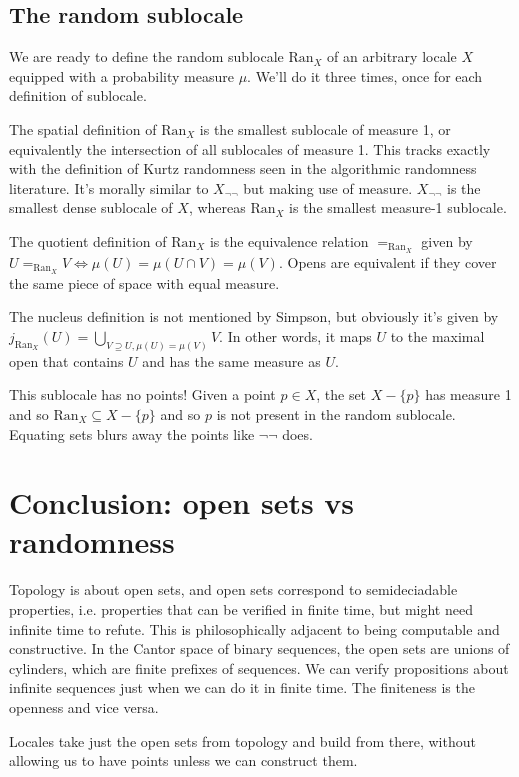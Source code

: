 \documentclass[14pt]{extarticle}
\newcommand{\ran}{\ensuremath{\mathrm{Ran}}}
\begin{document}
\subsection{The random sublocale}
We are ready to define the random sublocale $\ran_X$ of an arbitrary locale $X$ equipped with a probability measure $\mu$. We'll do it three times, once for each definition of sublocale.

The spatial definition of $\ran_X$ is the smallest sublocale of measure 1, or equivalently the intersection of all sublocales of measure 1. This tracks exactly with the definition of Kurtz randomness seen in the algorithmic randomness literature. It's morally similar to $X_{\neg\neg}$ but making use of measure. $X_{\neg\neg}$ is the smallest dense sublocale of $X$, whereas $\ran_X$ is the smallest measure-1 sublocale.

The quotient definition of $\ran_X$ is the equivalence relation $=_{\ran_X}$ given by $U=_{\ran_X} V \iff \mu(U)=\mu(U\cap V)=\mu(V)$. Opens are equivalent if they cover the same piece of space with equal measure.

The nucleus definition is not mentioned by Simpson, but obviously it's given by $j_{\ran_X}(U) = \bigcup_{V\supseteq U, \mu(U)=\mu(V)}V.$ In other words, it maps $U$ to the maximal open that contains $U$ and has the same measure as $U$.

This sublocale has no points! Given a point $p\in X$, the set $X-\{p\}$ has measure 1 and so $\ran_X\subseteq X-\{p\}$ and so $p$ is not present in the random sublocale. Equating sets blurs away the points like $\neg\neg$ does.

\section{Conclusion: open sets vs randomness}
Topology is about open sets, and open sets correspond to semideciadable properties, i.e. properties that can be verified in finite time, but might need infinite time to refute. This is philosophically adjacent to being computable and constructive. In the Cantor space of binary sequences, the open sets are unions of cylinders, which are finite prefixes of sequences. We can verify propositions about infinite sequences just when we can do it in finite time. The finiteness is the openness and vice versa.

Locales take just the open sets from topology and build from there, without allowing us to have points unless we can construct them.
\end{document}
